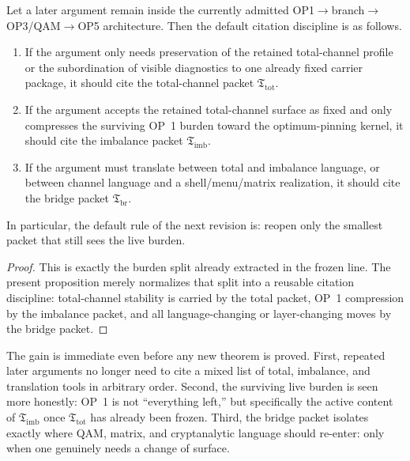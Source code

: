 \begin{proposition}
\label{prop:channel-sorted-citation-rule}
Let a later argument remain inside the currently admitted OP1$\to$branch$\to$OP3/QAM$\to$OP5 architecture. Then the default citation discipline is as follows.
\begin{enumerate}[leftmargin=2em]
  \item If the argument only needs preservation of the retained total-channel profile or the subordination of visible diagnostics to one already fixed carrier package, it should cite the total-channel packet \(\mathfrak T_{\mathrm{tot}}\).
  \item If the argument accepts the retained total-channel surface as fixed and only compresses the surviving OP~1 burden toward the optimum-pinning kernel, it should cite the imbalance packet \(\mathfrak T_{\mathrm{imb}}\).
  \item If the argument must translate between total and imbalance language, or between channel language and a shell/menu/matrix realization, it should cite the bridge packet \(\mathfrak T_{\mathrm{br}}\).
\end{enumerate}
In particular, the default rule of the next revision is: reopen only the smallest packet that still sees the live burden.
\end{proposition}

\begin{proof}
This is exactly the burden split already extracted in the frozen line. The present proposition merely normalizes that split into a reusable citation discipline: total-channel stability is carried by the total packet, OP~1 compression by the imbalance packet, and all language-changing or layer-changing moves by the bridge packet.
\end{proof}

\begin{remark}
\label{rem:normalized-ledger-gain}
The gain is immediate even before any new theorem is proved. First, repeated later arguments no longer need to cite a mixed list of total, imbalance, and translation tools in arbitrary order. Second, the surviving live burden is seen more honestly: OP~1 is not ``everything left,'' but specifically the active content of \(\mathfrak T_{\mathrm{imb}}\) once \(\mathfrak T_{\mathrm{tot}}\) has already been frozen. Third, the bridge packet isolates exactly where QAM, matrix, and cryptanalytic language should re-enter: only when one genuinely needs a change of surface.
\end{remark}

